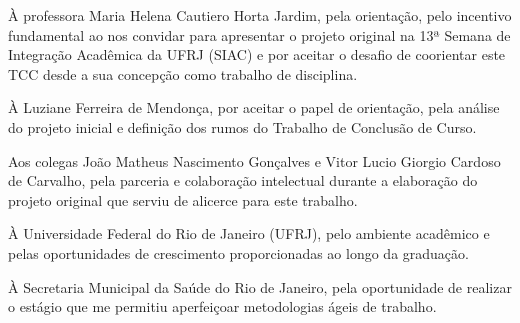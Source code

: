 \begin{agradecimentos}
À professora Maria Helena Cautiero Horta Jardim, pela orientação, pelo incentivo fundamental ao nos convidar para apresentar o projeto original na 13ª Semana de Integração Acadêmica da UFRJ (SIAC) e por aceitar o desafio de coorientar este TCC desde a sua concepção como trabalho de disciplina.

À Luziane Ferreira de Mendonça, por aceitar o papel de orientação, pela análise do projeto inicial e definição dos rumos do Trabalho de Conclusão de Curso.

Aos colegas João Matheus Nascimento Gonçalves e Vitor Lucio Giorgio Cardoso de Carvalho, pela parceria e colaboração intelectual durante a elaboração do projeto original que serviu de alicerce para este trabalho.

À Universidade Federal do Rio de Janeiro (UFRJ), pelo ambiente acadêmico e pelas oportunidades de crescimento proporcionadas ao longo da graduação.

À Secretaria Municipal da Saúde do Rio de Janeiro, pela oportunidade de realizar o estágio que me permitiu aperfeiçoar metodologias ágeis de trabalho.
\end{agradecimentos}